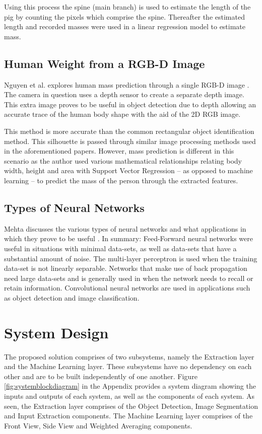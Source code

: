\documentclass[conference]{IEEEtran}
\begin{document}
Using this process the spine (main branch) is used to estimate the length of the pig by counting the pixels which comprise the spine.
Thereafter the estimated length and recorded masses were used in a linear regression model to estimate mass.
\subsection{Human Weight from a RGB-D Image}
Nguyen et al. explores human mass prediction through a single RGB-D image \cite{nguyen2014seeing}.
The camera in question uses a depth sensor to create a separate depth image. 
This extra image proves to be useful in object detection due to depth allowing an accurate trace of the human body shape with the aid of the 2D RGB image. 

This method is more accurate than the common rectangular object identification method. 
This silhouette is passed through similar image processing methods used in the aforementioned papers. 
However, mass prediction is different in this scenario as the author used various mathematical relationships relating body width, height and area with Support Vector Regression -- as opposed to machine learning -- to predict the mass of the person through the extracted features. 
\subsection{Types of Neural Networks}
Mehta discusses the various types of neural networks and what applications in which they prove to be useful \cite{mehta_2019}. 
In summary: Feed-Forward neural networks were useful in situations with minimal data-sets, as well as data-sets that have a substantial amount of noise.
The multi-layer perceptron is used when the training data-set is not linearly separable.
Networks that make use of back propagation need large data-sets and is generally used in when the network needs to recall or retain information.
Convolutional neural networks are used in applications such as object detection and image classification.
\section{System Design}
The proposed solution comprises of two subsystems, namely the Extraction layer and the Machine Learning layer.
These subsystems have no dependency on each other and are to be built independently of one another.
Figure \ref{fig:systemblockdiagram} in the Appendix provides a system diagram showing the inputs and outputs of each system, as well as the components of each system.
As seen, the Extraction layer comprises of the Object Detection, Image Segmentation and Input Extraction components.
The Machine Learning layer comprises of the Front View, Side View and Weighted Averaging components.
\end{document}
